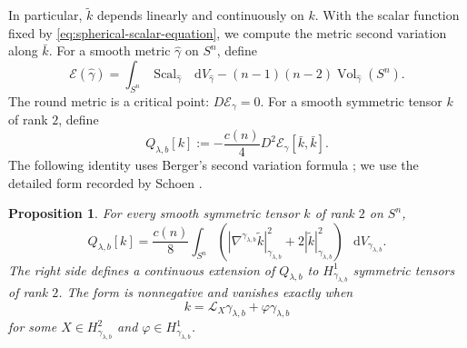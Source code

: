 \documentclass[11pt]{article}
\numberwithin{equation}{section}
\newtheorem{proposition}[theorem]{Proposition}
\theoremstyle{remark}
\newcommand{\Sph}{S}
\newcommand{\dd}{\mathop{}\!\mathrm{d}}
\begin{document}
In particular, \(\widetilde k\) depends linearly and continuously on \(k\).
With the scalar function fixed by \eqref{eq:spherical-scalar-equation},
we compute the metric second variation along \(\bar k\).
For a smooth metric
\(\widehat\gamma\) on \(\Sph^n\), define
\[
 \mathcal E(\widehat\gamma)
 =\int_{\Sph^n}\operatorname{Scal}_{\widehat\gamma}\,\dd V_{\widehat\gamma}
 -(n-1)(n-2)\operatorname{Vol}_{\widehat\gamma}(\Sph^n).
\]
The round metric is a critical point: \(D\mathcal E_\gamma=0\).
For a smooth symmetric tensor \(k\) of rank \(2\), define
 {
\begin{equation}\label{eq:metric-second-variation-form}
  Q_{\lambda,b}[k]
 :=-\frac{c(n)}4D^2\mathcal E_\gamma[\bar k,\bar k].
\end{equation}
}
The following identity uses Berger's second variation
formula \cite[formula  (4.2)]{BergerVariation}; we use the detailed form
recorded by Schoen \cite[Section  1]{SchoenVariational}.

\begin{proposition}\label{prop:euclidean-quadratic-form-kernel}
For every smooth symmetric tensor \(k\) of rank \(2\) on \(\Sph^n\),
 {
\begin{equation}\label{eq:general-euclidean-metric-form}
  Q_{\lambda,b}[k]
 =\frac{c(n)}8\int_{\Sph^n}
 \left(
 |\nabla^{\gamma_{\lambda,b}}\widetilde k|_{\gamma_{\lambda,b}}^2
 +2|\widetilde k|_{\gamma_{\lambda,b}}^2
 \right)\,\dd V_{\gamma_{\lambda,b}}.
\end{equation}
}
{The right side defines a continuous extension of
\(Q_{\lambda,b}\) to \(H^1_{\gamma_{\lambda,b}}\) symmetric
tensors of rank \(2\).} The form is
nonnegative and vanishes exactly when
\[
 k=\mathcal L_X\gamma_{\lambda,b}+\varphi\gamma_{\lambda,b}
\]
for some \(X\in H^2_{\gamma_{\lambda,b}}\) and
\(\varphi\in H^1_{\gamma_{\lambda,b}}\).
\end{proposition}
\end{document}
